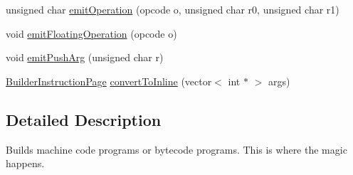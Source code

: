 \begin{DoxyCompactItemize}
unsigned char \hyperlink{classnightowl_1_1Builder_ac000d57e3b37cf973e19bc7ac36caad2}{emit\-Operation} (opcode o, unsigned char r0, unsigned char r1)
\item 
void \hyperlink{classnightowl_1_1Builder_a038698fb5f2b7328a66185dacff24096}{emit\-Floating\-Operation} (opcode o)
\item 
void \hyperlink{classnightowl_1_1Builder_ac8c3f1706099016585199549dae2a9b8}{emit\-Push\-Arg} (unsigned char r)
\item 
\hyperlink{classnightowl_1_1BuilderInstructionPage}{Builder\-Instruction\-Page} \hyperlink{classnightowl_1_1Builder_abcafb5a55b2ab1fbcd469b71202d2c20}{convert\-To\-Inline} (vector$<$ int $\ast$ $>$ args)
\end{DoxyCompactItemize}


\subsection{Detailed Description}
Builds machine code programs or bytecode programs. This is where the magic happens. 

